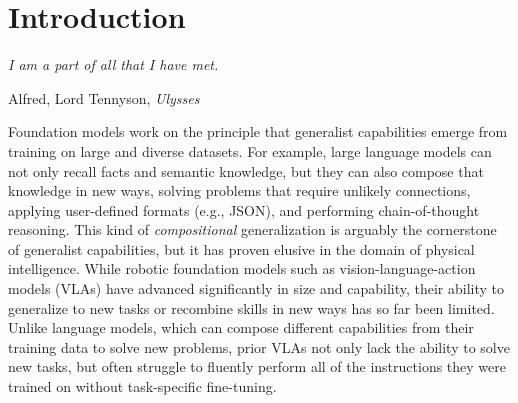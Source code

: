 \documentclass[conference]{IEEEtran}
\def \MethodName {$\pi_{0.7}$}
\begin{document}
\begin{abstract}
We present a new robotic foundation model, called \MethodName{}, that can enable strong out-of-the-box performance in a wide range of scenarios. \MethodName{} can follow diverse language instructions in unseen environments, including multi-stage tasks with various kitchen appliances, provide zero-shot cross-embodiment generalization, for example enabling a robot to fold laundry without seeing the task before, and perform challenging tasks such as operating an espresso machine out of the box at a level of performance that matches much more specialized RL-finetuned models. The main idea behind \MethodName{} is to use diverse context conditioning during training. This conditioning information, contained in the prompt, makes it possible to steer the model precisely to perform many tasks with different strategies. It is conditioned not just on a language command that describes what it should do, but on additional multimodal information that also describes the manner or strategy in which it should do it, including metadata about task performance and subgoal images. This enables \MethodName{} to use very diverse data, including demonstrations, potentially suboptimal (autonomous) data including failures, and data from non-robot sources. Our experiments evaluate \MethodName{} across numerous tasks with multiple robot platforms, on tasks that require speed and dexterity, language following, and compositional task generalization.
\end{abstract}

\IEEEpeerreviewmaketitle

\section{Introduction}

\setlength{\epigraphwidth}{0.42\textwidth}
\epigraph{\textit{I am a part of all that I have met.}}{Alfred, Lord Tennyson, \textit{Ulysses}}

Foundation models work on the principle that generalist capabilities emerge from training on large and diverse datasets. For example, large language models can not only recall facts and semantic knowledge, but they can also compose that knowledge in new ways, solving problems that require unlikely connections, applying user-defined formats (e.g., JSON), and performing chain-of-thought reasoning. 
This kind of \emph{compositional} generalization is arguably the cornerstone of generalist capabilities, but it has proven elusive in the domain of physical intelligence. While robotic foundation models such as vision-language-action models (VLAs) have advanced significantly in size and capability, their ability to generalize to new tasks or recombine skills in new ways has so far been limited. Unlike language models, which can compose different capabilities from their training data to solve new problems, prior VLAs not only lack the ability to solve new tasks, but often struggle to fluently perform all of the instructions they were trained on without task-specific fine-tuning.
\end{document}
